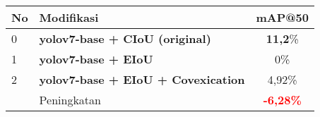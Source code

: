 \begin{table}[h]
  \centering
  \label{tbl:loss_function_perf}
  \vspace{-1ex}
  \begin{tabular}{ l l c }
    \toprule[1.5pt]
    No & Modifikasi        &mAP@50 \\
    \midrule
    0  & \textbf{yolov7-base + CIoU (original)}     & \textbf{11,2}\%\\
    1  & \textbf{yolov7-base + EIoU}                & 0\%\\
    2  & \textbf{yolov7-base + EIoU + Covexication} & 4,92\%\\
    \midrule
       & Peningkatan                                & \textbf{\textcolor{red}{-6,28\%}}\\
    \bottomrule[1.5pt]
  \end{tabular}
\end{table}